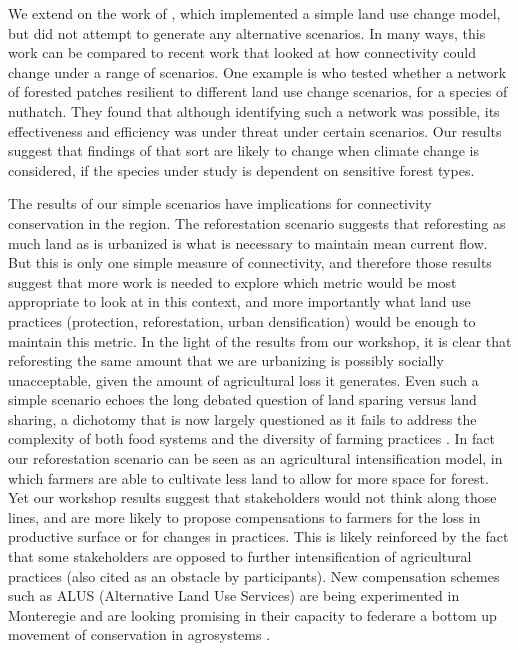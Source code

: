 {We extend on the work of \cite{albert_applying_2017}, which implemented a simple land use change model, but did not attempt to generate any alternative scenarios. In many ways, this work can be compared to recent work that looked at how connectivity could change under a range of scenarios. One example is \cite{rubio_sustaining_2012} who tested whether a network of forested patches resilient to different land use change scenarios, for a species of nuthatch. They found that although identifying such a network was possible, its effectiveness and efficiency was under threat under certain scenarios. Our results suggest that findings of that sort are likely to change when climate change is considered, if the species under study is dependent on sensitive forest types. 

The results of our simple scenarios have implications for connectivity conservation in the region. The reforestation scenario suggests that reforesting as much land as is urbanized is what is necessary to maintain mean current flow. But this is only one simple measure of connectivity, and therefore those results suggest that more work is needed to explore which metric would be most appropriate to look at in this context, and more importantly what land use practices (protection, reforestation, urban densification) would be enough to maintain this metric. In the light of the results from our workshop, it is clear that reforesting the same amount that we are urbanizing is possibly socially unacceptable, given the amount of agricultural loss it generates. Even such a simple scenario echoes the long debated question of land sparing versus land sharing, a dichotomy that is now largely questioned as it fails to address the complexity of both food systems and the diversity of farming practices \cite{tscharntke_global_2012, bennett_changing_2017}. In fact our reforestation scenario can be seen as an agricultural intensification model, in which farmers are able to cultivate less land to allow for more space for forest. Yet our workshop results suggest that stakeholders would not think along those lines, and are more likely to propose compensations to farmers for the loss in productive surface or for changes in practices. This is likely reinforced by the fact that some stakeholders are opposed to further intensification of agricultural practices (also cited as an obstacle by participants). New compensation schemes such as ALUS (Alternative Land Use Services) are being experimented in Monteregie and are looking promising in their capacity to federare a bottom up movement of conservation in agrosystems \cite{ouellet_community_2020}. 

}
